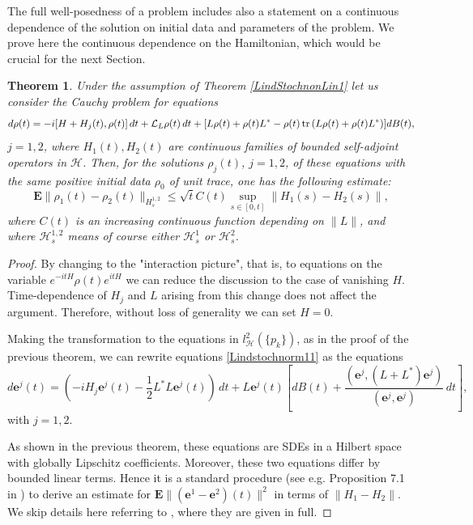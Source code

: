 \documentclass[12pt]{article}
\def\LC{\mathcal{L}}
\def\HC{\mathcal{H}}
\def\E{\mathbf{E}}
\def\e{\mathbf{e}}
\def\tr{\rm{tr}}
\newtheorem{theorem}{Theorem}[section]
\begin{document}
The full well-posedness of a problem includes also a statement on a continuous dependence of
the solution on initial data and parameters of the problem. We prove here the continuous dependence
on the Hamiltonian, which would be crucial for the next Section.

 \begin{theorem}
\label{LindStochnonLin2}
Under the assumption of Theorem \ref{LindStochnonLin1}
let us consider the Cauchy problem for equations
\begin{equation}
\label{Lindstochnorm11}
d\rho(t)=-i[H+H_j(t),\rho(t)]\, dt+\LC_L \rho (t)\, dt
+[L\rho(t)+\rho(t) L^*-\rho(t)\, {\tr} \, (L\rho(t)+\rho(t) L^*) ] dB(t),
\end{equation}
$j=1,2$, where $H_1(t), H_2(t)$ are continuous families of bounded self-adjoint
 operators in $\HC$.
Then, for the solutions $\rho_j(t)$, $j=1,2$, of these equations with the same
positive initial data $\rho_0$ of unit trace, one has the following estimate:
\begin{equation}
\label{Lindstochnorm12}
\E \|\rho_1(t)-\rho_2(t)\|_{H^{1,2}_s} \le \sqrt t C(t) \sup_{s\in [0,t]}\|H_1(s)-H_2(s)\|,
\end{equation}
where $C(t)$ is an increasing continuous function depending on $\|L\|$,
and where $\HC^{1,2}_s$ means of course either $\HC^1_s$ or $\HC^2_s$.
\end{theorem}

\begin{proof} By changing to the "interaction picture", that is, to equations
on the variable $e^{-itH}\rho(t) e^{itH}$ we can reduce the discussion to the case
of vanishing $H$. Time-dependence of $H_j$ and $L$ arising from this change does
not affect the argument. Therefore, without loss of generality we can set $H=0$.

Making the transformation to the equations in $l^2_{\HC}(\{p_k\})$,
as in the proof of the previous theorem,
 we can rewrite equations \eqref{Lindstochnorm11} as the equations
\begin{equation}
\label{eqinfdim11}
d \e^j(t)=(-iH_j \e^j(t)-\frac12 L^*L \e^j(t))\, dt +L\e^j(t)
\left[dB(t)+\frac{(\e^j, (L+L^*) \e^j)}{(\e^j, \e^j)} \, dt\right],
\end{equation}
with $j=1,2$.

As shown in the previous theorem, these equations are SDEs in a Hilbert space
with globally Lipschitz coefficients. Moreover, these two equations differ by
bounded linear terms. Hence it is a standard procedure
(see e.g. Proposition 7.1 in \cite{KolQuantLLN}) to derive an
estimate for $\E \|(\e^1-\e^2)(t)\|^2$ in terms of $\|H_1-H_2\|$.
We skip details here referring to \cite{Kol25a}, where they are given in full.
\end{proof}
\end{document}
